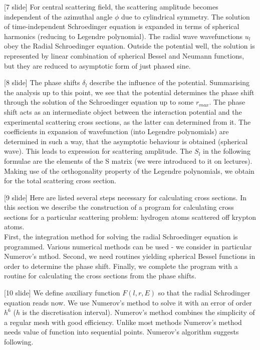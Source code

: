 \documentclass[12pt]{article}
\begin{document}
[7 slide] For central scattering field, the scattering amplitude becomes independent of the azimuthal angle $\phi$ due to cylindrical symmetry. The solution of time-independent Schroedinger equation is expanded in terms of spherical harmonics (reducing to Legendre polynomial). The radial wave wavefunctions $u_l$ obey the Radial Schroedinger equation. Outside the potential well, the solution is represented by linear combination of spherical Bessel and Neumann functions, but they are reduced to asymptotic form of just phased sine. 

[8 slide] The phase shifts $\delta_l$ describe the influence of the potential. Summarising the analysis up to this point, we see that the potential determines the phase shift through the solution of the Schroedinger equation up to some $r_{max}$. The phase shift acts as an intermediate object between the interaction potential and the experimental scattering cross sections, as the latter can determined from it. The coefficients in expansion of wavefunction (into Legendre polynomials) are determined in such a way, that the asymptotic behaviour is obtained (spherical wave). This leads to expression for scattering amplitude. The $S_l$ in the following formulae are the elements of the S matrix (we were introduced to it on lectures). Making use of the orthogonality property of the Legendre polynomials, we obtain for the total scattering cross section.    

[9 slide] Here are listed several steps necessary for calculating cross sections. In this section we describe the construction of a program for calculating cross sections for a particular scattering problem: hydrogen atoms scattered off krypton atoms. \\
First, the integration method for solving the radial Schroedinger equation is programmed. Various numerical methods can be used - we consider in particular Numerov's mthod. Second, we need routines yielding spherical Bessel functions in order to determine the phase shift. Finally, we complete the program with a routine for calculating the cross sections from the phase shifts.

[10 slide] We define auxiliary function $F(l, r, E)$ so that the radial Schrodinger equation reads now. We use Numerov's method to solve it with an error of order $h^6$ ($h$ is the discretisation interval). Numerov's method combines the simplicity of a regular mesh with good efficiency. Unlike most methods Numerov's method needs value of function into sequential points. Numerov's algorithm suggests following.  
\end{document}
